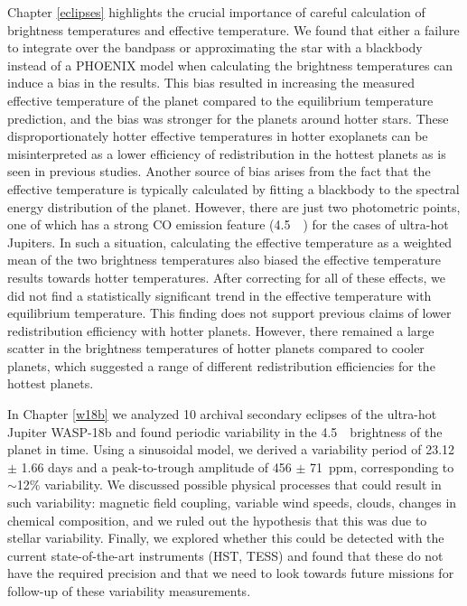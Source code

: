 Chapter \ref{eclipses} highlights the crucial importance of careful calculation of brightness temperatures and effective temperature. We found that either a failure to integrate over the \spitzer bandpass or approximating the star with a blackbody instead of a PHOENIX model when calculating the brightness temperatures can induce a bias in the results. This bias resulted in increasing the measured effective temperature of the planet compared to the equilibrium temperature prediction, and the bias was stronger for the planets around hotter stars. These disproportionately hotter effective temperatures in hotter exoplanets can be misinterpreted as a lower efficiency of redistribution in the hottest planets as is seen in previous studies. Another source of bias arises from the fact that the effective temperature is typically calculated by fitting a blackbody to the spectral energy distribution of the planet. However, there are just two photometric points, one of which has a strong CO emission feature (4.5~\um~) for the cases of ultra-hot Jupiters. In such a situation, calculating the effective temperature as a weighted mean of the two \spitzer brightness temperatures also biased the effective temperature results towards hotter temperatures. After correcting for all of these effects, we did not find a statistically significant trend in the effective temperature with equilibrium temperature. This finding does not support previous claims of lower redistribution efficiency with hotter planets. However, there remained a large scatter in the brightness temperatures of hotter planets compared to cooler planets, which suggested a range of different redistribution efficiencies for the hottest planets.

In Chapter \ref{w18b} we analyzed 10 archival secondary eclipses of the ultra-hot Jupiter WASP-18b and found periodic variability in the 4.5~\um~brightness of the planet in time. Using a sinusoidal model, we derived a variability period of 23.12 $\pm$ 1.66 days and a peak-to-trough amplitude of 456 $\pm$ 71~ppm, corresponding to $\sim$12\% variability. We discussed possible physical processes that could result in such variability: magnetic field coupling, variable wind speeds, clouds, changes in chemical composition, and we ruled out the hypothesis that this was due to stellar variability. Finally, we explored whether this could be detected with the current state-of-the-art instruments (HST, TESS) and found that these do not have the required precision and that we need to look towards future missions for follow-up of these variability measurements.


